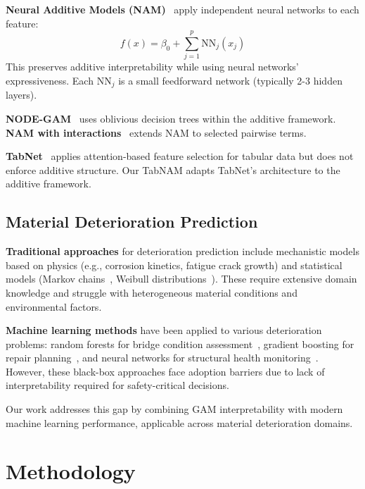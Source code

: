 \documentclass[twocolumn]{article}
\begin{document}
\textbf{Neural Additive Models (NAM)}~\cite{agarwal2021nam} apply independent neural networks to each feature:
\begin{equation}
f(x) = \beta_0 + \sum_{j=1}^{p} \text{NN}_j(x_j)
\end{equation}
This preserves additive interpretability while using neural networks' expressiveness. Each $\text{NN}_j$ is a small feedforward network (typically 2-3 hidden layers).

\textbf{NODE-GAM}~\cite{chang2021nodegam} uses oblivious decision trees within the additive framework. \textbf{NAM with interactions}~\cite{tsang2020neural} extends NAM to selected pairwise terms.

\textbf{TabNet}~\cite{arik2021tabnet} applies attention-based feature selection for tabular data but does not enforce additive structure. Our TabNAM adapts TabNet's architecture to the additive framework.

\subsection{Material Deterioration Prediction}

\textbf{Traditional approaches} for deterioration prediction include mechanistic models based on physics (e.g., corrosion kinetics, fatigue crack growth) and statistical models (Markov chains~\cite{cesare1992modeling}, Weibull distributions~\cite{frangopol2004life}). These require extensive domain knowledge and struggle with heterogeneous material conditions and environmental factors.

\textbf{Machine learning methods} have been applied to various deterioration problems: random forests for bridge condition assessment~\cite{xia2020bridge}, gradient boosting for repair planning~\cite{rashidi2020bridge}, and neural networks for structural health monitoring~\cite{jeong2018bridge}. However, these black-box approaches face adoption barriers due to lack of interpretability required for safety-critical decisions.

Our work addresses this gap by combining GAM interpretability with modern machine learning performance, applicable across material deterioration domains.

\section{Methodology}
\label{sec:method}
\end{document}
